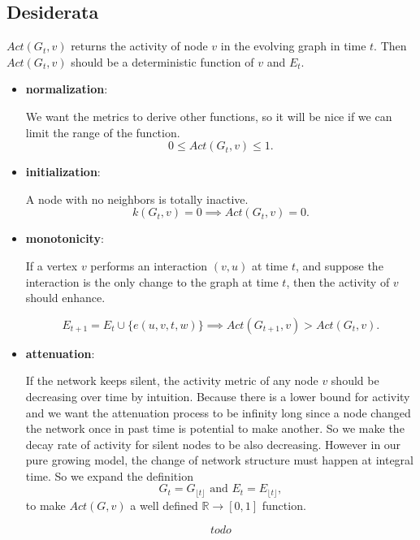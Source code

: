 \documentclass[12pt,abstract=true]{scrartcl}
\numberwithin{equation}{section}
\theoremstyle{definition}   \newtheorem{definition}{Definition}[section]
\theoremstyle{plain}        \newtheorem{theorem}{Theorem}[section]
\theoremstyle{plain}        \newtheorem{observation}{Observation}[section]
\theoremstyle{plain}        \newtheorem{fact}{Fact}[section]
\theoremstyle{plain}        \newtheorem{claim}{Claim}[section]
\theoremstyle{plain}        \newtheorem{lemma}[theorem]{Lemma}
\theoremstyle{plain}        \newtheorem{corollary}[theorem]{Corollary}
\theoremstyle{remark}       \newtheorem{example}{Example}[section]
\theoremstyle{remark}       \newtheorem{remark}{Remark}[section]
\begin{document}
\subsection{Desiderata}
 $Act(G_t,v)$ returns the activity of node $v$ in the evolving graph in
time $t$. Then $Act(G_t,v)$ should be a deterministic function of $v$ and
$E_t$.
\begin{itemize}
\item \textbf{normalization}:

We want the metrics to derive other functions, so it will be nice if we can
limit the range of the function.
\begin{equation}
0\leq Act(G_t,v) \leq 1.
\end{equation}

\item \textbf{initialization}:

A node with no neighbors is totally inactive.
\begin{equation}
k(G_t,v)=0\implies Act(G_t,v)=0.
\end{equation}

\item \textbf{monotonicity}:

If a vertex $v$ performs an interaction $(v,u)$ at time $t$, and suppose the
interaction is the only change to the graph at time $t$, then the activity of
$v$ should enhance.

\begin{equation}
E_{t+1}=E_t\cup\{e(u,v,t,w)\}\implies Act(G_{t+1},v)>Act(G_{t},v).
\end{equation}


\item \textbf{attenuation}:

If the network keeps silent, the activity metric of any node $v$ should be
decreasing over time by intuition. Because there is a lower bound for activity
and we want
the attenuation process to be infinity long since a node changed the network
once in past time is potential to make another. So we make the decay rate
of activity for silent nodes to be also decreasing. However in our pure growing
model, the change of network structure must happen at integral time. So we
expand the definition
\begin{equation}
G_t=G_{\lfloor t \rfloor}\text{ and } E_t=E_{\lfloor t \rfloor},
\end{equation}
to make $Act(G,v)$ a well defined $\mathbb{R}\to [0,1]$ function.

\begin{equation}
todo
\end{equation}

\end{itemize}
\end{document}
